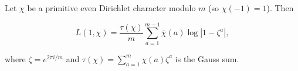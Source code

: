 Let $\chi$ be a primitive even Dirichlet character modulo $m$ (so $\chi(-1) = 1$). Then

$$L(1, \chi) = \frac{\tau(\chi)}{m} \sum_{a=1}^{m-1} \overline{\chi}(a) \log|1 - \zeta^a|,$$

where $\zeta = e^{2\pi i / m}$ and $\tau(\chi) = \sum_{a=1}^{m} \chi(a) \zeta^a$ is the Gauss sum.
